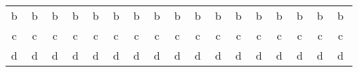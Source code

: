 \documentclass[letterpaper,10pt]{article}
\begin{document}
\begin{center}
\begin{tabular}{ccccccccccccccccc}
\textcircled{b} & \textcircled{b} & \textcircled{b} & \textcircled{b} & \textcircled{b} & \textcircled{b} & \textcircled{b} & \textcircled{b} & \textcircled{b} & \textcircled{b} & \textcircled{b} & \textcircled{b} & \textcircled{b} & \textcircled{b} & \textcircled{b} & \textcircled{b} & \textcircled{b}\\
\textcircled{c} & \textcircled{c} & \textcircled{c} & \textcircled{c} & \textcircled{c} & \textcircled{c} & \textcircled{c} & \textcircled{c} & \textcircled{c} & \textcircled{c} & \textcircled{c} & \textcircled{c} & \textcircled{c} & \textcircled{c} & \textcircled{c} & \textcircled{c} & \textcircled{c}\\
\textcircled{d} & \textcircled{d}& \textcircled{d} & \textcircled{d} & \textcircled{d} & \textcircled{d} & \textcircled{d} & \textcircled{d} & \textcircled{d} & \textcircled{d} & \textcircled{d} & \textcircled{d} & \textcircled{d} & \textcircled{d} & \textcircled{d} & \textcircled{d} & \textcircled{d}\\
\end{tabular}
\end{center}
\vspace*{.6cm}
\dotfill
\vspace*{.6cm}
\end{document}
